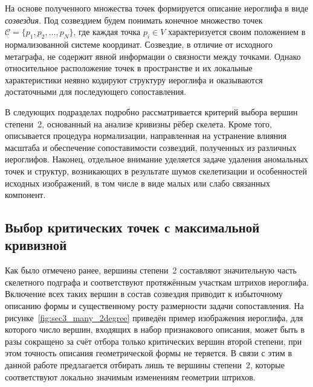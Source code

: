 На основе полученного множества точек формируется описание иероглифа в виде \emph{созвездия}. Под созвездием будем понимать конечное множество точек \(\mathcal{C} = \{p_1, p_2, \dots, p_N\}\),
где каждая точка \(p_i \in V\) характеризуется своим положением в нормализованной системе координат. Созвездие, в отличие от исходного метаграфа, не содержит явной информации о связности между точками. Однако относительное расположение точек в пространстве и их локальные характеристики неявно кодируют структуру иероглифа и оказываются достаточными для последующего сопоставления.

В следующих подразделах подробно рассматривается критерий выбора вершин степени~2, основанный на анализе кривизны рёбер скелета. Кроме того, описывается процедура нормализации, направленная на устранение влияния масштаба и обеспечение сопоставимости созвездий, полученных из различных иероглифов. Наконец, отдельное внимание уделяется задаче удаления аномальных точек и структур, возникающих в результате шумов скелетизации и особенностей исходных изображений, в том числе в виде малых или слабо связанных компонент.

\subsection{Выбор критических точек с максимальной кривизной}\label{sec:ch3/sec3/sub1}

Как было отмечено ранее, вершины степени~2 составляют значительную часть скелетного подграфа и соответствуют протяжённым участкам штрихов иероглифа. Включение всех таких вершин в состав созвездия приводит к избыточному описанию формы и существенному росту размерности задачи сопоставления. На рисунке~\cref{fig:sec3_many_2degree} приведён пример изображения иероглифа, для которого число вершин, входящих в набор признакового описания, может быть в разы сокращено за счёт отбора только критических вершин второй степени, при этом точность описания геометрической формы не теряется. В связи с этим в данной работе предлагается отбирать лишь те вершины степени~2, которые соответствуют локально значимым изменениям геометрии штрихов.

